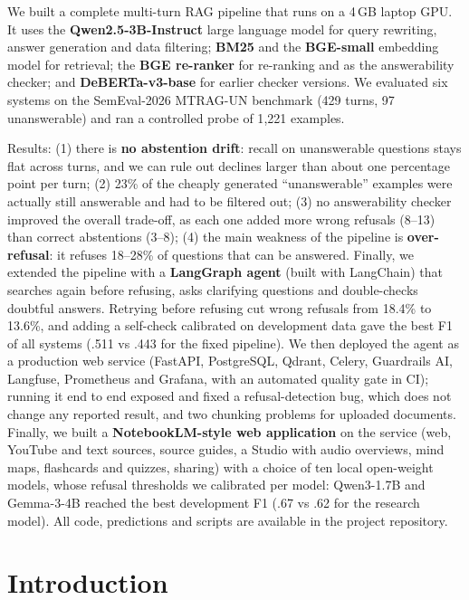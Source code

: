 \documentclass[11pt,a4paper]{report}
\begin{document}
We built a complete multi-turn RAG pipeline that runs on a 4\,GB laptop GPU. It uses the \textbf{Qwen2.5-3B-Instruct} large language model for query rewriting, answer generation and data filtering; \textbf{BM25} and the \textbf{BGE-small} embedding model for retrieval; the \textbf{BGE re-ranker} for re-ranking and as the answerability checker; and \textbf{DeBERTa-v3-base} for earlier checker versions. We evaluated six systems on the SemEval-2026 MTRAG-UN benchmark (429 turns, 97 unanswerable) and ran a controlled probe of 1{,}221 examples.

Results: (1) there is \textbf{no abstention drift}: recall on unanswerable questions stays flat across turns, and we can rule out declines larger than about one percentage point per turn; (2) 23\% of the cheaply generated ``unanswerable'' examples were actually still answerable and had to be filtered out; (3) no answerability checker improved the overall trade-off, as each one added more wrong refusals (8--13) than correct abstentions (3--8); (4) the main weakness of the pipeline is \textbf{over-refusal}: it refuses 18--28\% of questions that can be answered. Finally, we extended the pipeline with a \textbf{LangGraph agent} (built with LangChain) that searches again before refusing, asks clarifying questions and double-checks doubtful answers. Retrying before refusing cut wrong refusals from 18.4\% to 13.6\%, and adding a self-check calibrated on development data gave the best F1 of all systems (.511 vs .443 for the fixed pipeline). We then deployed the agent as a production web service (FastAPI, PostgreSQL, Qdrant, Celery, Guardrails AI, Langfuse, Prometheus and Grafana, with an automated quality gate in CI); running it end to end exposed and fixed a refusal-detection bug, which does not change any reported result, and two chunking problems for uploaded documents. Finally, we built a \textbf{NotebookLM-style web application} on the service (web, YouTube and text sources, source guides, a Studio with audio overviews, mind maps, flashcards and quizzes, sharing) with a choice of ten local open-weight models, whose refusal thresholds we calibrated per model: Qwen3-1.7B and Gemma-3-4B reached the best development F1 (.67 vs .62 for the research model). All code, predictions and scripts are available in the project repository.

\tableofcontents
\listoffigures
\listoftables

\clearpage
{}

\chapter{Introduction}
\end{document}
